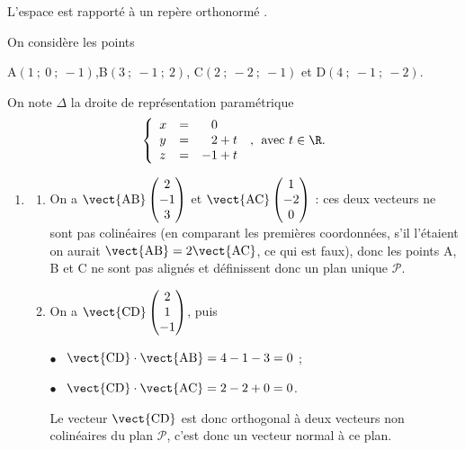 
\medskip

L'espace est rapporté à un repère orthonormé \Oijk.

On considère les points 
\begin{center}A$(1~;~0~;~-1)$,\quad  B$(3~;~-1~;~2)$, \quad C$(2~;~-2~;~ -1)$ \quad et \quad D$(4~;~-1~;~-2)$.\end{center}

On note $\Delta$ la droite de représentation paramétrique 
\[\left\{\begin{array}{l c l}
x &=&\phantom{-}0\\
y &=&\phantom{-}2 + t\\
z &=& -1 + t
\end{array}\right.\:,\:\: \text{avec } t\in \R.\]

\begin{enumerate}
\item 
	\begin{enumerate}
		\item %
On a $\vect{\text{AB}}\begin{pmatrix}2\\-1\\3\end{pmatrix}$ et $\vect{\text{AC}}\begin{pmatrix}1\\-2\\0\end{pmatrix}$ : ces deux vecteurs ne sont pas colinéaires (en comparant les premières coordonnées, s'il l'étaient on aurait $\vect{\text{AB}} = 2\vect{\text{AC}}$, ce qui est faux), donc les points A, B et C ne sont pas alignés et définissent donc un plan unique $\mathcal{P}$.
		\item %
On a $\vect{\text{CD}}\begin{pmatrix}2\\1\\-1 \end{pmatrix}$, puis 

$\bullet~~$ $\vect{\text{CD}} \cdot \vect{\text{AB}} = 4 - 1 - 3 = 0$ ;

$\bullet~~$ $\vect{\text{CD}} \cdot \vect{\text{AC}} = 2 - 2 + 0 = 0$.

Le vecteur $\vect{\text{CD}}$ est donc orthogonal à deux vecteurs non colinéaires du plan $\mathcal{P}$, c'est donc un vecteur normal à ce plan.


\end{enumerate}
\end{enumerate}
